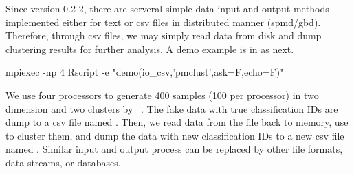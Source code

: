 Since  version 0.2-2, there are serveral simple data input
and output methods implemented either for text or csv files in distributed
manner (spmd/gbd). Therefore, through csv files, we may simply read data from
disk and dump clustering results for further analysis. A demo example is
in  as next.
\begin{Command}
mpiexec -np 4 Rscript -e "demo(io_csv,'pmclust',ask=F,echo=F)"
\end{Command}

We use four processors to generate 400 samples (100 per processor)
in two dimension and two clusters by
~\citep{Melnykov2012}. The fake data with true classification IDs
are dump to a csv file named .
Then, we read data from the file back to memory, use  to
cluster them, and dump the data with new classification IDs to a new csv
file named .
Similar input and output process can be replaced by other file formats,
data streams, or databases.


